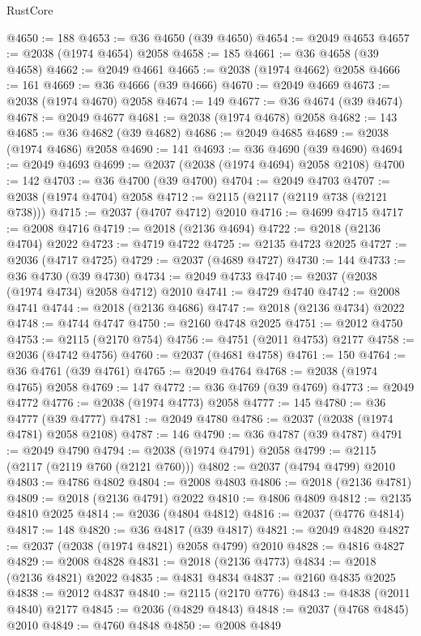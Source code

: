 \begin{lexlean}{RustCore}
\begin{coremodule}
@4650 := 188
@4653 := @36 @4650 (@39 @4650)
@4654 := @2049 @4653
@4657 := @2038 (@1974 @4654) @2058
@4658 := 185
@4661 := @36 @4658 (@39 @4658)
@4662 := @2049 @4661
@4665 := @2038 (@1974 @4662) @2058
@4666 := 161
@4669 := @36 @4666 (@39 @4666)
@4670 := @2049 @4669
@4673 := @2038 (@1974 @4670) @2058
@4674 := 149
@4677 := @36 @4674 (@39 @4674)
@4678 := @2049 @4677
@4681 := @2038 (@1974 @4678) @2058
@4682 := 143
@4685 := @36 @4682 (@39 @4682)
@4686 := @2049 @4685
@4689 := @2038 (@1974 @4686) @2058
@4690 := 141
@4693 := @36 @4690 (@39 @4690)
@4694 := @2049 @4693
@4699 := @2037 (@2038 (@1974 @4694) @2058 @2108)
@4700 := 142
@4703 := @36 @4700 (@39 @4700)
@4704 := @2049 @4703
@4707 := @2038 (@1974 @4704) @2058
@4712 := @2115 (@2117 (@2119 @738 (@2121 @738)))
@4715 := @2037 (@4707 @4712) @2010
@4716 := @4699 @4715
@4717 := @2008 @4716
@4719 := @2018 (@2136 @4694)
@4722 := @2018 (@2136 @4704) @2022
@4723 := @4719 @4722
@4725 := @2135 @4723 @2025
@4727 := @2036 (@4717 @4725)
@4729 := @2037 (@4689 @4727)
@4730 := 144
@4733 := @36 @4730 (@39 @4730)
@4734 := @2049 @4733
@4740 := @2037 (@2038 (@1974 @4734) @2058 @4712) @2010
@4741 := @4729 @4740
@4742 := @2008 @4741
@4744 := @2018 (@2136 @4686)
@4747 := @2018 (@2136 @4734) @2022
@4748 := @4744 @4747
@4750 := @2160 @4748 @2025
@4751 := @2012 @4750
@4753 := @2115 (@2170 @754)
@4756 := @4751 (@2011 @4753) @2177
@4758 := @2036 (@4742 @4756)
@4760 := @2037 (@4681 @4758)
@4761 := 150
@4764 := @36 @4761 (@39 @4761)
@4765 := @2049 @4764
@4768 := @2038 (@1974 @4765) @2058
@4769 := 147
@4772 := @36 @4769 (@39 @4769)
@4773 := @2049 @4772
@4776 := @2038 (@1974 @4773) @2058
@4777 := 145
@4780 := @36 @4777 (@39 @4777)
@4781 := @2049 @4780
@4786 := @2037 (@2038 (@1974 @4781) @2058 @2108)
@4787 := 146
@4790 := @36 @4787 (@39 @4787)
@4791 := @2049 @4790
@4794 := @2038 (@1974 @4791) @2058
@4799 := @2115 (@2117 (@2119 @760 (@2121 @760)))
@4802 := @2037 (@4794 @4799) @2010
@4803 := @4786 @4802
@4804 := @2008 @4803
@4806 := @2018 (@2136 @4781)
@4809 := @2018 (@2136 @4791) @2022
@4810 := @4806 @4809
@4812 := @2135 @4810 @2025
@4814 := @2036 (@4804 @4812)
@4816 := @2037 (@4776 @4814)
@4817 := 148
@4820 := @36 @4817 (@39 @4817)
@4821 := @2049 @4820
@4827 := @2037 (@2038 (@1974 @4821) @2058 @4799) @2010
@4828 := @4816 @4827
@4829 := @2008 @4828
@4831 := @2018 (@2136 @4773)
@4834 := @2018 (@2136 @4821) @2022
@4835 := @4831 @4834
@4837 := @2160 @4835 @2025
@4838 := @2012 @4837
@4840 := @2115 (@2170 @776)
@4843 := @4838 (@2011 @4840) @2177
@4845 := @2036 (@4829 @4843)
@4848 := @2037 (@4768 @4845) @2010
@4849 := @4760 @4848
@4850 := @2008 @4849

\end{coremodule}
\end{lexlean}
